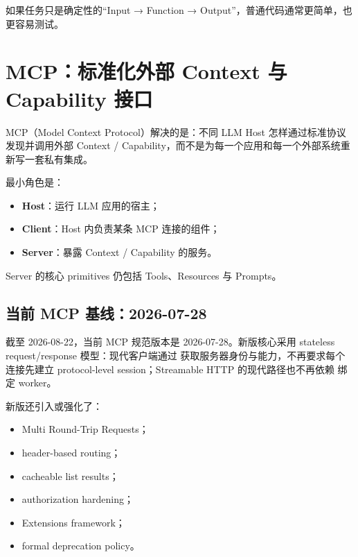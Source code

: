 \documentclass[profile=standard,twoside=false]{ipara-handbook}
\begin{document}
如果任务只是确定性的“Input → Function → Output”，普通代码通常更简单，也更容易测试。

\section{MCP：标准化外部 Context 与 Capability 接口}

MCP（Model Context Protocol）解决的是：不同 LLM Host 怎样通过标准协议发现并调用外部 Context / Capability，而不是为每一个应用和每一个外部系统重新写一套私有集成。

最小角色是：

\begin{itemize}
  \item \textbf{Host}：运行 LLM 应用的宿主；
  \item \textbf{Client}：Host 内负责某条 MCP 连接的组件；
  \item \textbf{Server}：暴露 Context / Capability 的服务。
\end{itemize}

Server 的核心 primitives 仍包括 Tools、Resources 与 Prompts。

\begin{handbookdiagram}
\centering

\end{handbookdiagram}

\subsection{当前 MCP 基线：2026-07-28}

截至 2026-08-22，当前 MCP 规范版本是 2026-07-28。新版核心采用 stateless request/response 模型：现代客户端通过  获取服务器身份与能力，不再要求每个连接先建立 protocol-level session；Streamable HTTP 的现代路径也不再依赖  绑定 worker。

新版还引入或强化了：

\begin{itemize}
  \item Multi Round-Trip Requests；
  \item header-based routing；
  \item cacheable list results；
  \item authorization hardening；
  \item Extensions framework；
  \item formal deprecation policy。
\end{itemize}
\end{document}
